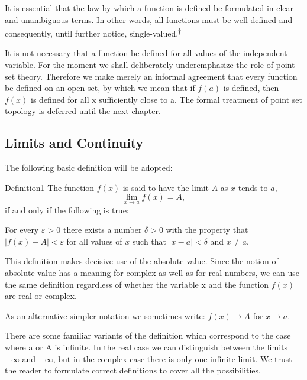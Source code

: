 It is essential that the law by which a function is defined be formulated in clear and unambiguous terms. In other words, all functions must be well defined and consequently, until further notice, single-valued.\hyperlink{fn:38:dagger}{\textsuperscript{\ensuremath{\dagger}}}

It is not necessary that a function be defined for all values of the independent variable. For the moment we shall deliberately underemphasize the role of point set theory. Therefore we make merely an informal agreement that every function be defined on an open set, by which we mean that if $f(a)$ is defined, then $f(x)$ is defined for all x sufficiently close to a. The formal treatment of point set topology is deferred until the next chapter.

\setcounter{section}{1}\setcounter{subsection}{0}\subsection{Limits and Continuity}\label{sec:2.1.1}
The following basic definition will be adopted:

\begin{originalstatement}{Definition}{1}\label{def:2.1}
The function $f(x)$ is said to have the limit $A$ as $x$ tends to $a$,
\begin{equation*}
\lim _ {x \rightarrow a} f (x) = A,\tag{1}\label{eq:2.1}
\end{equation*}
if and only if the following is true:

For every $\varepsilon > 0$ there exists a number $\delta > 0$ with the property that $|f(x) - A| < \varepsilon$ for all values of $x$ such that $|x - a| < \delta$ and $x \neq a$.

\end{originalstatement}
This definition makes decisive use of the absolute value. Since the notion of absolute value has a meaning for complex as well as for real numbers, we can use the same definition regardless of whether the variable x and the function $f(x)$ are real or complex.

As an alternative simpler notation we sometimes write: $f(x) \to A$ for $x \to a$.

There are some familiar variants of the definition which correspond to the case where a or A is infinite. In the real case we can distinguish between the limits $+\infty$ and $-\infty$, but in the complex case there is only one infinite limit. We trust the reader to formulate correct definitions to cover all the possibilities.

